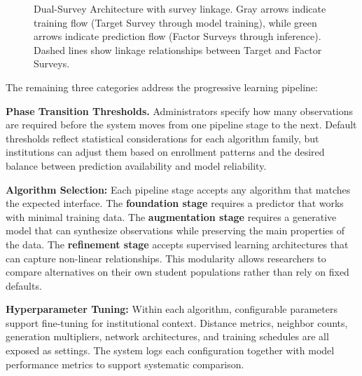 \documentclass[letterpaper,11pt]{article}
\begin{document}
\begin{figure}[htbp]
{
}%
\caption{Dual-Survey Architecture with survey linkage. Gray arrows indicate training flow (Target Survey through model training), while green arrows indicate prediction flow (Factor Surveys through inference). Dashed lines show linkage relationships between Target and Factor Surveys.}
\label{fig:linkage}
\end{figure}

The remaining three categories address the progressive learning pipeline:

\textbf{Phase Transition Thresholds.} Administrators specify how many observations are required before the system moves from one pipeline stage to the next. Default thresholds reflect statistical considerations for each algorithm family, but institutions can adjust them based on enrollment patterns and the desired balance between prediction availability and model reliability.

\textbf{Algorithm Selection:} Each pipeline stage accepts any algorithm that matches the expected interface. The \textbf{foundation stage} requires a predictor that works with minimal training data. The \textbf{augmentation stage} requires a generative model that can synthesize observations while preserving the main properties of the data. The \textbf{refinement stage} accepts supervised learning architectures that can capture non-linear relationships. This modularity allows researchers to compare alternatives on their own student populations rather than rely on fixed defaults.

\textbf{Hyperparameter Tuning:} Within each algorithm, configurable parameters support fine-tuning for institutional context. Distance metrics, neighbor counts, generation multipliers, network architectures, and training schedules are all exposed as settings. The system logs each configuration together with model performance metrics to support systematic comparison.
\end{document}
